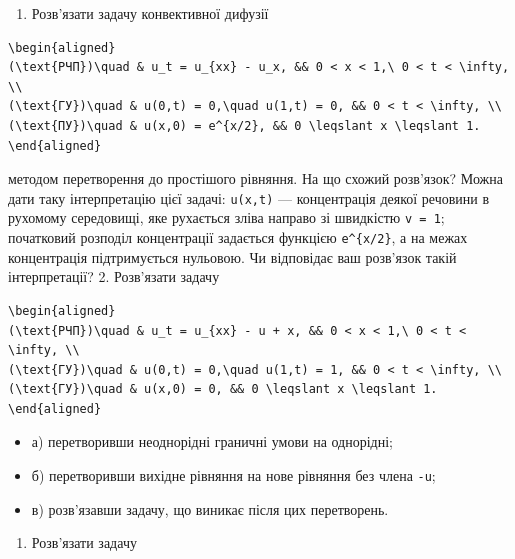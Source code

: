 \documentclass[
  ukrainian,
]{article}
\providecommand{\tightlist}{%
  \setlength{\itemsep}{0pt}\setlength{\parskip}{0pt}}
\begin{document}
\begin{enumerate}
\def\labelenumi{\arabic{enumi}.}
\tightlist
\item
  Розв'язати задачу конвективної дифузії
\end{enumerate}

\begin{verbatim}
\begin{aligned}
(\text{РЧП})\quad & u_t = u_{xx} - u_x, && 0 < x < 1,\ 0 < t < \infty, \\
(\text{ГУ})\quad & u(0,t) = 0,\quad u(1,t) = 0, && 0 < t < \infty, \\
(\text{ПУ})\quad & u(x,0) = e^{x/2}, && 0 \leqslant x \leqslant 1.
\end{aligned}
\end{verbatim}

методом перетворення до простішого рівняння. На що схожий розв'язок?
Можна дати таку інтерпретацію цієї задачі: \texttt{u(x,t)} ---
концентрація деякої речовини в рухомому середовищі, яке рухається зліва
направо зі швидкістю \texttt{v\ =\ 1}; початковий розподіл концентрації
задається функцією \texttt{e\^{}\{x/2\}}, а на межах концентрація
підтримується нульовою. Чи відповідає ваш розв'язок такій інтерпретації?
2. Розв'язати задачу

\begin{verbatim}
\begin{aligned}
(\text{РЧП})\quad & u_t = u_{xx} - u + x, && 0 < x < 1,\ 0 < t < \infty, \\
(\text{ГУ})\quad & u(0,t) = 0,\quad u(1,t) = 1, && 0 < t < \infty, \\
(\text{ГУ})\quad & u(x,0) = 0, && 0 \leqslant x \leqslant 1.
\end{aligned}
\end{verbatim}

\begin{itemize}
\tightlist
\item
  а) перетворивши неоднорідні граничні умови на однорідні;
\item
  б) перетворивши вихідне рівняння на нове рівняння без члена
  \texttt{-u};
\item
  в) розв'язавши задачу, що виникає після цих перетворень.
\end{itemize}

\begin{enumerate}
\def\labelenumi{\arabic{enumi}.}
\setcounter{enumi}{2}
\tightlist
\item
  Розв'язати задачу
\end{enumerate}
\end{document}
